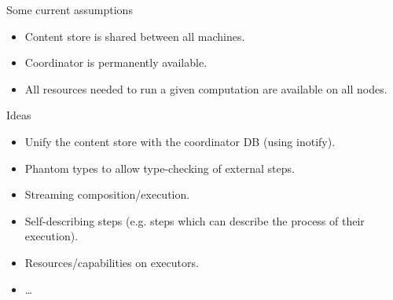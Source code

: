 \documentclass[11pt]{beamer}
\begin{document}
\begin{frame}{Some current assumptions}
\begin{itemize}
\item Content store is shared between all machines.
\item Coordinator is permanently available.
\item All resources needed to run a given computation are available on all nodes.
\end{itemize}
\end{frame}

\begin{frame}{Ideas}
\begin{itemize}
\item Unify the content store with the coordinator DB (using inotify).
\item Phantom types to allow type-checking of external steps.
\item Streaming composition/execution.
\item Self-describing steps (e.g. steps which can describe the process of their execution).
\item Resources/capabilities on executors.
\item \dots
\end{itemize}
\end{frame}
\end{document}
